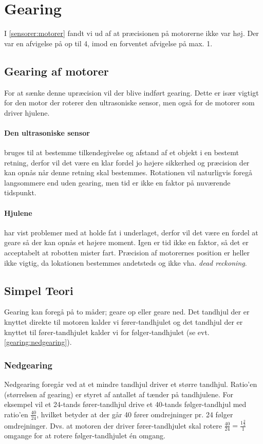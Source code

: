 \section{Gearing}
I \cref{sensorer:motorer} fandt vi ud af at præcisionen på motorerne ikke var høj.
Der var en afvigelse på op til 4\dg, imod en forventet afvigelse på max. 1\dg.

\subsection{Gearing af motorer}
For at sænke denne upræcision vil der blive indført gearing.
Dette er især vigtigt for den motor der roterer den ultrasoniske sensor, men også for de motorer som driver hjulene.

\paragraph{Den ultrasoniske sensor} bruges til at bestemme tilkendegivelse og afstand af et objekt i en bestemt retning, derfor vil det være en klar fordel jo højere sikkerhed og præcision der kan opnås når denne retning skal bestemmes.
Rotationen vil naturligvis foregå langsommere end uden gearing, men tid er ikke en faktor på nuværende tidspunkt.

\paragraph{Hjulene} har vist problemer med at holde fat i underlaget, derfor vil det være en fordel at geare så der kan opnås et højere moment.
Igen er tid ikke en faktor, så det er acceptabelt at robotten mister fart.
Præcision af motorernes position er heller ikke vigtig, da lokationen bestemmes andetsteds og ikke vha. \textit{dead reckoning}.

\subsection{Simpel Teori}\label{gearing:simpel_teori}
Gearing kan foregå på to måder; geare op eller geare ned.
Det tandhjul der er knyttet direkte til motoren kalder vi fører-tandhjulet og det tandhjul der er knyttet til fører-tandhjulet kalder vi for følger-tandhjulet (se evt. \cref{gearing:nedgearing}).

\subsubsection{Nedgearing}
Nedgearing foregår ved at et mindre tandhjul driver et større tandhjul.
Ratio'en (størrelsen af gearing) er styret af antallet af tænder på tandhjulene.
For eksempel vil et 24-tands fører-tandhjul drive et 40-tands følger-tandhjul med ratio'en $\frac{40}{24}$, hvilket betyder at der går 40 fører omdrejninger pr. 24 følger omdrejninger. Dvs. at motoren der driver fører-tandhjulet skal rotere $\frac{40}{24} = \frac{1 \frac{2}{3}}{1}$ omgange for at rotere følger-tandhjulet én omgang.

